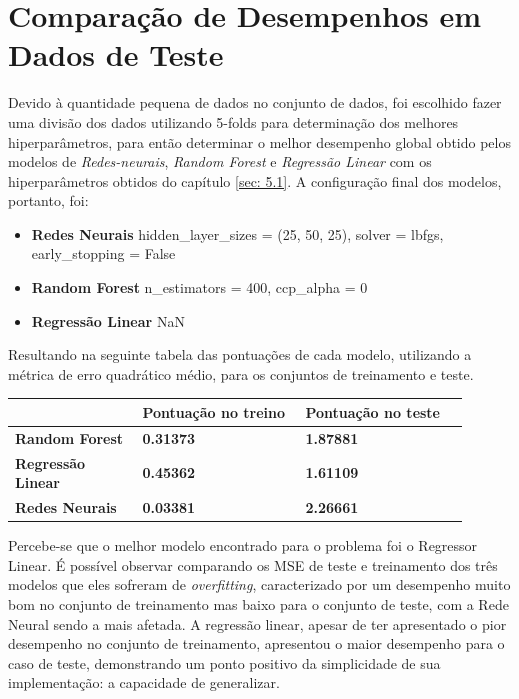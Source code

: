 \documentclass{report}
\let\oldsection\section
\renewcommand\section{\clearpage\oldsection}
\begin{document}
\section{Comparação de Desempenhos em Dados de Teste}
Devido à quantidade pequena de dados no conjunto de dados, foi escolhido fazer uma divisão dos dados utilizando 5-folds para determinação dos melhores hiperparâmetros, para então determinar o melhor desempenho global obtido pelos modelos de \textit{Redes-neurais}, \textit{Random Forest} e \textit{Regressão Linear} com os hiperparâmetros obtidos do capítulo \ref{sec: 5.1}.
A configuração final dos modelos, portanto, foi:

\begin{itemize}
    \item \textbf{Redes Neurais}
    hidden\_layer\_sizes = (25, 50, 25), solver = lbfgs, early\_stopping = False
    \item \textbf{Random Forest}
    n\_estimators = 400, ccp\_alpha = 0
    \item \textbf{Regressão Linear}
    NaN
\end{itemize}

Resultando na seguinte tabela das pontuações de cada modelo, utilizando a métrica de erro quadrático médio, para os conjuntos de treinamento e teste.

\noindent
\begin{tabular}{|>{\centering\arraybackslash}m{0.25\linewidth}|>{\centering\arraybackslash}m{0.325\linewidth}|>{\centering\arraybackslash}m{0.325\linewidth}|}
    \hline
      & \textbf{Pontuação no treino} & \textbf{Pontuação no teste}\\
    \hline
    \textbf{Random Forest} & \textbf{0.31373} & \textbf{1.87881}\\ 
    \hline
    \textbf{Regressão Linear} & \textbf{0.45362} & \textbf{1.61109}\\ 
    \hline
    \textbf{Redes Neurais} & \textbf{0.03381} & \textbf{2.26661}\\ 
    \hline
\end{tabular}

Percebe-se que o melhor modelo encontrado para o problema foi o Regressor Linear. É possível observar comparando os MSE de teste e treinamento dos três modelos que eles sofreram de \textit{overfitting}, caracterizado por um desempenho muito bom no conjunto de treinamento mas baixo para o conjunto de teste, com a Rede Neural sendo a mais afetada. A regressão linear, apesar de ter apresentado o pior desempenho no conjunto de treinamento, apresentou o maior desempenho para o caso de teste, demonstrando um ponto positivo da simplicidade de sua implementação: a capacidade de generalizar.
\end{document}
